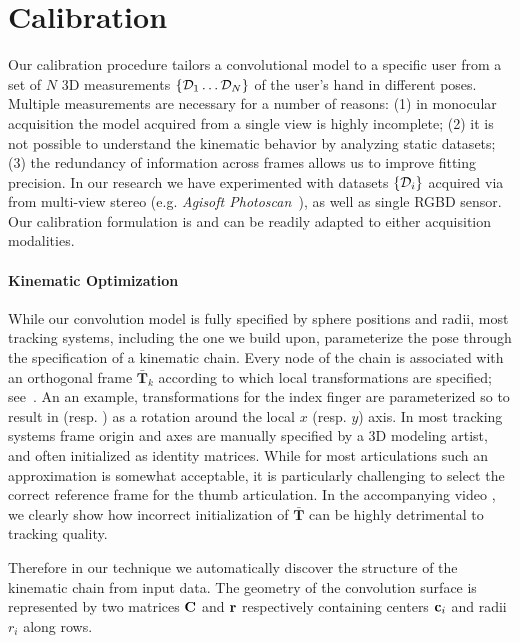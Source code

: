 \section{Calibration}
Our calibration procedure tailors a convolutional model to a specific user from a set of $N$ 3D measurements $\{ \mathcal{D}_1 \dots \mathcal{D}_N \}$ of the user's hand in different poses. Multiple measurements are necessary for a number of reasons: (1) in monocular acquisition the model acquired from a single view is highly incomplete; (2) it is not possible to understand the kinematic behavior by analyzing static datasets; (3) the redundancy of information across frames allows us to improve fitting precision. In our research we have experimented with datasets $\{\mathcal{D}_i\}$ acquired via from multi-view stereo (e.g. \emph{Agisoft Photoscan~\textcopyright}), as well as single RGBD sensor. Our calibration formulation is  and can be readily adapted to either acquisition modalities.

\paragraph{Kinematic Optimization}
While our convolution model is fully specified by sphere positions and radii, most tracking systems, including the one we build upon, parameterize the pose through the specification of a kinematic chain. Every node of the chain is associated with an orthogonal frame $\mathbf{\bar{T}}_k$ according to which local transformations are specified; see~. An an example, transformations for the index finger are parameterized so to result in  (resp. ) as a rotation around the local $x$ (resp. $y$) axis. In most tracking systems frame origin and axes are manually specified by a 3D modeling artist, and often initialized as identity matrices. While for most articulations such an approximation is somewhat acceptable, it is particularly challenging to select the correct reference frame for the thumb articulation. In the accompanying video \todo{[00:00]}, we clearly show how incorrect initialization of $\mathbf{\bar{T}}$ can be highly detrimental to tracking quality.

\begin{DRAFT}
Therefore in our technique we automatically discover the structure of the kinematic chain from input data. The geometry of the convolution surface is represented by two matrices $\mathbf{C}$ and $\mathbf{r}$ respectively containing centers $\mathbf{c}_i$ and radii $r_i$ along rows. 
\end{DRAFT}

